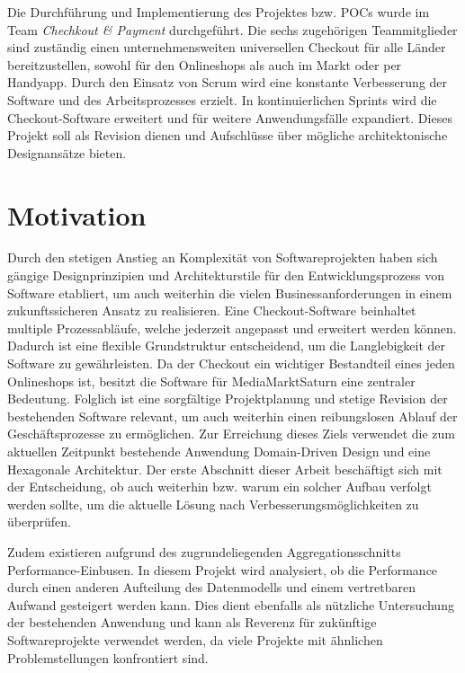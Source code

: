 Die Durchführung und Implementierung des Projektes bzw. \acrshort{POC}s wurde im Team \emph{Chechkout \& Payment} durchgeführt. Die sechs zugehörigen Teammitglieder sind zuständig einen unternehmensweiten universellen Checkout für alle Länder bereitzustellen, sowohl für den Onlineshops als auch im Markt oder per Handyapp. Durch den Einsatz von \Gls{Scrum} wird eine konstante Verbesserung der Software und des Arbeitsprozesses erzielt. In kontinuierlichen Sprints wird die Checkout-Software erweitert und für weitere Anwendungsfälle expandiert. Dieses Projekt soll als Revision dienen und Aufschlüsse über mögliche architektonische Designansätze bieten.


\section{Motivation}


Durch den stetigen Anstieg an Komplexität von Softwareprojekten haben sich gängige Designprinzipien und Architekturstile für den Entwicklungsprozess von Software etabliert, um auch weiterhin die vielen Businessanforderungen in einem zukunftssicheren Ansatz zu realisieren. Eine Checkout-Software beinhaltet multiple Prozessabläufe, welche jederzeit angepasst und erweitert werden können. Dadurch ist eine flexible Grundstruktur entscheidend, um die Langlebigkeit der Software zu gewährleisten. Da der Checkout ein wichtiger Bestandteil eines jeden Onlineshops ist, besitzt die Software für MediaMarktSaturn eine zentraler Bedeutung. Folglich ist eine sorgfältige Projektplanung und stetige Revision der bestehenden Software relevant, um auch weiterhin einen reibungslosen Ablauf der Geschäftsprozesse zu ermöglichen. Zur Erreichung dieses Ziels verwendet die zum aktuellen Zeitpunkt bestehende Anwendung Domain-Driven Design und eine Hexagonale Architektur. Der erste Abschnitt dieser Arbeit beschäftigt sich mit der Entscheidung, ob auch weiterhin bzw. warum ein solcher Aufbau verfolgt werden sollte, um die aktuelle Lösung nach Verbesserungsmöglichkeiten zu überprüfen. 

Zudem existieren aufgrund des zugrundeliegenden Aggregationsschnitts Performance-Einbusen. In diesem Projekt wird analysiert, ob die Performance durch einen anderen Aufteilung des Datenmodells und einem vertretbaren Aufwand gesteigert werden kann. Dies dient ebenfalls als nützliche Untersuchung der bestehenden Anwendung und kann als Reverenz für zukünftige Softwareprojekte verwendet werden, da viele Projekte mit ähnlichen Problemstellungen konfrontiert sind.



